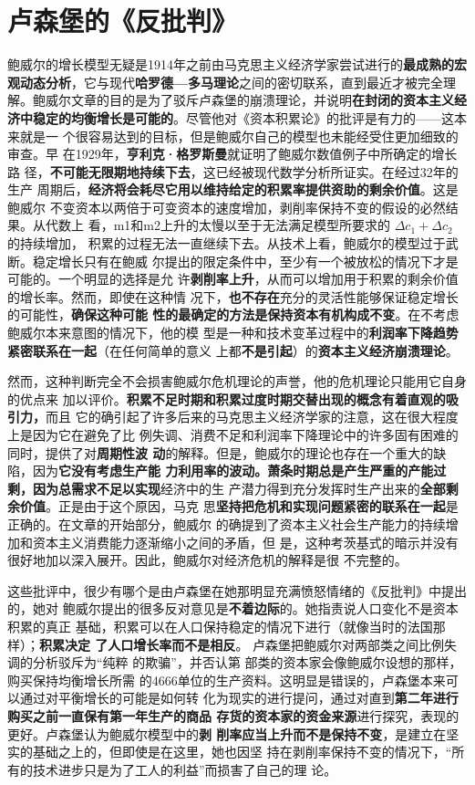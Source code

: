 \section{卢森堡的《反批判》}
鲍威尔的增长模型无疑是1914年之前由马克思主义经济学家尝试进行的\textbf{最成熟的宏
  观动态分析}，它与现代\textbf{哈罗德—多马理论}之间的密切联系，直到最近才被完全理
解。鲍威尔文章的目的是为了驳斥卢森堡的崩溃理论，并说明\textbf{在封闭的资本主义经
  济中稳定的均衡增长是可能的}。尽管他对《资本积累论》的批评是有力的——这本来就是一
个很容易达到的目标，但是鲍威尔自己的模型也未能经受住更加细致的审查。早
在1929年，\textbf{亨利克·格罗斯曼}就证明了鲍威尔数值例子中所确定的增长路
径，\textbf{不可能无限期地持续下去}，这已经被现代数学分析所证实。在经过32年的生产
周期后，\textbf{经济将会耗尽它用以维持给定的积累率提供资助的剩余价值}。这是鲍威尔
不变资本以两倍于可变资本的速度增加，剥削率保持不变的假设的必然结果。从代数上
看，m1和m2上升的太慢以至于无法满足模型所要求的 $\Delta c_1+\Delta c_2$ 的持续增加，
积累的过程无法一直继续下去。从技术上看，鲍威尔的模型过于武断。稳定增长只有在鲍威
尔提出的限定条件中，至少有一个被放松的情况下才是可能的。一个明显的选择是允
许\textbf{剥削率上升}，从而可以增加用于积累的剩余价值的增长率。然而，即使在这种情
况下，\textbf{也不存在}充分的灵活性能够保证稳定增长的可能性，\textbf{确保这种可能
  性的最确定的方法是保持资本有机构成不变}。在不考虑鲍威尔本来意图的情况下，他的模
型是一种和技术变革过程中的\textbf{利润率下降趋势紧密联系在一起}（在任何简单的意义
上都\textbf{不是引起}）的\textbf{资本主义经济崩溃理论}。

然而，这种判断完全不会损害鲍威尔危机理论的声誉，他的危机理论只能用它自身的优点来
加以评价。\textbf{积累不足时期和积累过度时期交替出现的概念有着直观的吸引力，}而且
它的确引起了许多后来的马克思主义经济学家的注意，这在很大程度上是因为它在避免了比
例失调、消费不足和利润率下降理论中的许多固有困难的同时，提供了对\textbf{周期性波
  动}的解释。但是，鲍威尔的理论也存在一个重大的缺陷，因为\textbf{它没有考虑生产能
  力利用率的波动。萧条时期总是产生严重的产能过剩，因为总需求不足以实现}经济中的生
产潜力得到充分发挥时生产出来的\textbf{全部剩余价值}。正是由于这个原因，马克
思\textbf{坚持把危机和实现问题紧密的联系在一起}是正确的。在文章的开始部分，鲍威尔
的确提到了资本主义社会生产能力的持续增加和资本主义消费能力逐渐缩小之间的矛盾，但
是，这种考茨基式的暗示并没有很好地加以深入展开。因此，鲍威尔对经济危机的解释是很
不完整的。

这些批评中，很少有哪个是由卢森堡在她那明显充满愤怒情绪的《反批判》中提出的，她对
鲍威尔提出的很多反对意见是\textbf{不着边际}的。她指责说人口变化不是资本积累的真正
基础，积累可以在人口保持稳定的情况下进行（就像当时的法国那样）；\textbf{积累决定
  了人口增长率而不是相反}。 卢森堡把鲍威尔对两部类之间比例失调的分析驳斥为“纯粹
的欺骗”，并否认第 部类的资本家会像鲍威尔设想的那样，购买保持均衡增长所需
的4666单位的生产资料。这明显是错误的，卢森堡本来可以通过对平衡增长的可能是如何转
化为现实的进行提问，通过对直到\textbf{第二年进行购买之前一直保有第一年生产的商品
  存货的资本家的资金来源}进行探究，表现的更好。卢森堡认为鲍威尔模型中的\textbf{剥
  削率应当上升而不是保持不变}，是建立在坚实的基础之上的，但即使是在这里，她也因坚
持在剥削率保持不变的情况下，“所有的技术进步只是为了工人的利益”而损害了自己的理
论。

